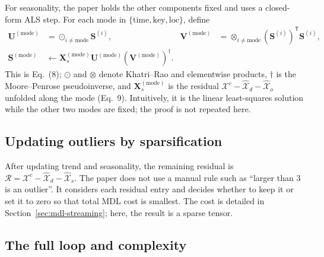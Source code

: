For seasonality, the paper holds the other components fixed and uses a closed-form ALS step. For each
mode in $\{\mathrm{time},\mathrm{key},\mathrm{loc}\}$, define
\begin{align}
  \mathbf{U}^{(\mathrm{mode})}
  &=\odot_{i\neq\mathrm{mode}}\mathbf{S}^{(i)},&
  \mathbf{V}^{(\mathrm{mode})}
  &=\otimes_{i\neq\mathrm{mode}}
    (\mathbf{S}^{(i)})^{\mathsf T}\mathbf{S}^{(i)},\\
  \mathbf{S}^{(\mathrm{mode})}
  &\leftarrow
    \mathbf{X}_s^{(\mathrm{mode})}
    \mathbf{U}^{(\mathrm{mode})}
    (\mathbf{V}^{(\mathrm{mode})})^{\dagger}.
  \label{eq:seasonal-update}
\end{align}
This is Eq.~(8); $\odot$ and $\otimes$ denote Khatri--Rao and elementwise products, $\dagger$ is the
Moore--Penrose pseudoinverse, and $\mathbf{X}_s^{(\mathrm{mode})}$ is the residual
$\mathcal{X}^{c}-\widehat{\mathcal{X}}_d-\widehat{\mathcal{X}}_o$ unfolded along the mode (Eq.~9).
Intuitively, it is the linear least-squares solution while the other two modes are fixed; the proof is
not repeated here.

\subsection{Updating outliers by sparsification}

After updating trend and seasonality, the remaining residual is
$\mathcal{R}=\mathcal{X}^{c}-\widehat{\mathcal{X}}_d-\widehat{\mathcal{X}}_s$. The paper does not use
a manual rule such as ``larger than 3 is an outlier''. It considers each residual entry and decides
whether to keep it or set it to zero so that total MDL cost is smallest. The cost is detailed in
Section~\ref{sec:mdl-streaming}; here, the result is a sparse tensor.

\subsection{The full loop and complexity}

